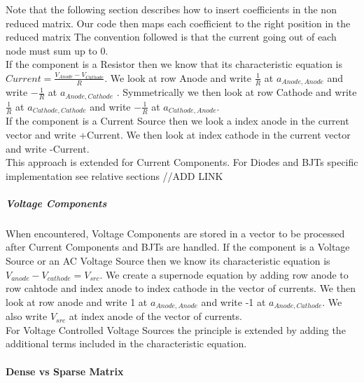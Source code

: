 \documentclass{article}
\begin{document}
Note that the following section describes how to insert coefficients in the non reduced matrix. Our code then maps each coefficient to the right position in the reduced matrix\bigbreak
The convention followed is that the current going out of each node must sum up to 0.\\
If the component is a Resistor then we know that its characteristic equation is $Current = \frac{V_{Anode} - V_{Cathode}}{R}$. We look at row Anode and write $\frac{1}{R}$ at $a_{Anode,Anode}$  and write $-\frac{1}{R}$ at $a_{Anode,Cathode}$ . Symmetrically we then look at row Cathode and write $\frac{1}{R}$ at $a_{Cathode,Cathode}$  and write $-\frac{1}{R}$ at $a_{Cathode,Anode}$.\\
If the component is a Current Source then we look a index anode in the current vector and write +Current. We then look at index cathode in the current vector and write -Current.\\
This approach is extended for Current Components. For Diodes and BJTs specific implementation see relative sections //ADD LINK

\subparagraph{Voltage Components}
When encountered, Voltage Components are stored in a vector to be processed after Current Components and BJTs are handled.\bigbreak
If the component is a Voltage Source or an AC Voltage Source then we know its characteristic equation is $V_{anode}-V_{cathode}=V_{src}$. We create a supernode equation by adding row anode to row cahtode and index anode to index cathode in the vector of currents. We then look at row anode and write 1 at $a_{Anode,Anode}$ and write -1 at $a_{Anode,Cathode}$. We also write $V_{src}$ at index anode of the vector of currents.\\ For Voltage Controlled Voltage Sources the principle is extended by adding the additional terms included in the characteristic equation.\bigbreak
\paragraph{Dense vs Sparse Matrix}






\newpage
\end{document}
